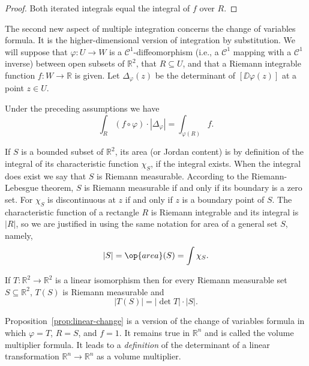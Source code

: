 \documentclass[11pt]{article}
\begin{document}
\begin{proof}
  Both iterated integrals equal the integral of $f$ over $R$.
\end{proof}

The second new aspect of multiple integration concerns the change of variables formula.  It is the higher-dimensional version of integration by substitution.  We will suppose that $\varphi : U \to W$ is a $\mathcal{C}^1$-diffeomorphism (i.e., a $\mathcal{C}^1$ mapping with a $\mathcal{C}^1$ inverse) between open subsets of $\mathbb{R}^2$, that $R \subseteq U$, and that a Riemann integrable function $f: W \to \mathbb{R}$ is given.  Let $\Delta_\varphi(z)$ be the determinant of $[\DD \varphi(z)]$ at a point $z \in U$.

\begin{thm}
  Under the preceding assumptions we have
  \[
    \int_R (f \circ \varphi) \cdot | \Delta_\varphi | = \int_{\varphi(R)} f.
  \]
\end{thm}

If $S$ is a bounded subset of $\mathbb{R}^2$, its \textsf{area} (or \textsf{Jordan content}) is by definition of the integral of its characteristic function $\chi_S$, if the integral exists.  When the integral does exist we say that $S$ is \textsf{Riemann measurable}.  According to the Riemann-Lebesgue theorem, $S$ is Riemann measurable if and only if its boundary is a zero set.  For $\chi_S$ is discontinuous at $z$ if and only if $z$ is a boundary point of $S$.  The characteristic function of a rectangle $R$ is Riemann integrable and its integral is $|R|$, so we are justified in using the same notation for area of a general set $S$, namely,
\[
  |S| = \op{area}(S) = \int \chi_S.
\]

\begin{prop}
  \label{prop:linear-change}
  If $T : \mathbb{R}^2 \to \mathbb{R}^2$ is a linear isomorphism then for every Riemann measurable set $S \subseteq \mathbb{R}^2$, $T(S)$ is Riemann measurable and
  \[
    |T(S)| = |\det T| \cdot |S|.
  \]
\end{prop}

Proposition~\ref{prop:linear-change} is a version of the change of variables formula in which $\varphi = T$, $R = S$, and $f = 1$.  It remains true in $\mathbb{R}^n$ and is called the \textsf{volume multiplier formula}.  It leads to a \textit{definition} of the determinant of a linear transformation $\mathbb{R}^n \to \mathbb{R}^n$ as a volume multiplier.
\end{document}
